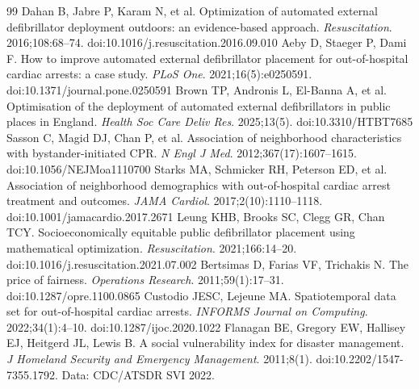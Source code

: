 \documentclass[11pt]{article}
\begin{document}
\begin{thebibliography}{99}
 Dahan B, Jabre P, Karam N, et al. Optimization of automated external defibrillator deployment outdoors: an evidence-based approach. \emph{Resuscitation}. 2016;108:68--74. doi:10.1016/j.resuscitation.2016.09.010
 Aeby D, Staeger P, Dami F. How to improve automated external defibrillator placement for out-of-hospital cardiac arrests: a case study. \emph{PLoS One}. 2021;16(5):e0250591. doi:10.1371/journal.pone.0250591
 Brown TP, Andronis L, El-Banna A, et al. Optimisation of the deployment of automated external defibrillators in public places in England. \emph{Health Soc Care Deliv Res}. 2025;13(5). doi:10.3310/HTBT7685
 Sasson C, Magid DJ, Chan P, et al. Association of neighborhood characteristics with bystander-initiated CPR. \emph{N Engl J Med}. 2012;367(17):1607--1615. doi:10.1056/NEJMoa1110700
 Starks MA, Schmicker RH, Peterson ED, et al. Association of neighborhood demographics with out-of-hospital cardiac arrest treatment and outcomes. \emph{JAMA Cardiol}. 2017;2(10):1110--1118. doi:10.1001/jamacardio.2017.2671
 Leung KHB, Brooks SC, Clegg GR, Chan TCY. Socioeconomically equitable public defibrillator placement using mathematical optimization. \emph{Resuscitation}. 2021;166:14--20. doi:10.1016/j.resuscitation.2021.07.002
 Bertsimas D, Farias VF, Trichakis N. The price of fairness. \emph{Operations Research}. 2011;59(1):17--31. doi:10.1287/opre.1100.0865
 Custodio JESC, Lejeune MA. Spatiotemporal data set for out-of-hospital cardiac arrests. \emph{INFORMS Journal on Computing}. 2022;34(1):4--10. doi:10.1287/ijoc.2020.1022
 Flanagan BE, Gregory EW, Hallisey EJ, Heitgerd JL, Lewis B. A social vulnerability index for disaster management. \emph{J Homeland Security and Emergency Management}. 2011;8(1). doi:10.2202/1547-7355.1792. Data: CDC/ATSDR SVI 2022.
\end{thebibliography}
\end{document}
